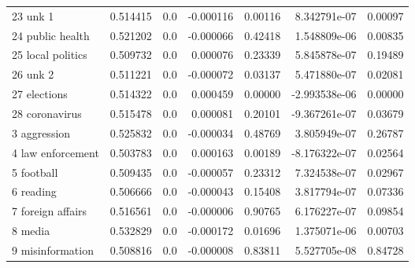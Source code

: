 \begin{tabular}{lrrrrrr}
23 unk 1                   &  0.514415 &     0.0 &    -0.000116 &  0.00116 &    8.342791e-07 &  0.00097 \\
24 public health           &  0.521202 &     0.0 &    -0.000066 &  0.42418 &    1.548809e-06 &  0.00835 \\
25 local politics          &  0.509732 &     0.0 &     0.000076 &  0.23339 &    5.845878e-07 &  0.19489 \\
26 unk 2                   &  0.511221 &     0.0 &    -0.000072 &  0.03137 &    5.471880e-07 &  0.02081 \\
27 elections               &  0.514322 &     0.0 &     0.000459 &  0.00000 &   -2.993538e-06 &  0.00000 \\
28 coronavirus             &  0.515478 &     0.0 &     0.000081 &  0.20101 &   -9.367261e-07 &  0.03679 \\
3 aggression               &  0.525832 &     0.0 &    -0.000034 &  0.48769 &    3.805949e-07 &  0.26787 \\
4 law enforcement          &  0.503783 &     0.0 &     0.000163 &  0.00189 &   -8.176322e-07 &  0.02564 \\
5 football                 &  0.509435 &     0.0 &    -0.000057 &  0.23312 &    7.324538e-07 &  0.02967 \\
6 reading                  &  0.506666 &     0.0 &    -0.000043 &  0.15408 &    3.817794e-07 &  0.07336 \\
7 foreign affairs          &  0.516561 &     0.0 &    -0.000006 &  0.90765 &    6.176227e-07 &  0.09854 \\
8 media                    &  0.532829 &     0.0 &    -0.000172 &  0.01696 &    1.375071e-06 &  0.00703 \\
9 misinformation           &  0.508816 &     0.0 &    -0.000008 &  0.83811 &    5.527705e-08 &  0.84728 \\
\bottomrule
\end{tabular}
